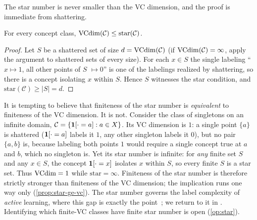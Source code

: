 The star number is never smaller than the VC dimension, and the proof is immediate from shattering.

\begin{prop}
\label{prop:star-ge-vc}
For every concept class, $\mathrm{VCdim}(\mathcal{C}) \leq \mathrm{star}(\mathcal{C})$.
\end{prop}

\begin{proof}
Let $S$ be a shattered set of size $d = \mathrm{VCdim}(\mathcal{C})$ (if $\mathrm{VCdim}(\mathcal{C}) = \infty$, apply the argument to shattered sets of every size). For each $x \in S$ the single labeling ``$x \mapsto 1$, all other points of $S$ $\mapsto 0$'' is one of the labelings realized by shattering, so there is a concept isolating $x$ within $S$. Hence $S$ witnesses the star condition, and $\mathrm{star}(\mathcal{C}) \geq |S| = d$.
\end{proof}

\begin{warning}
\label{rmk:star-not-equiv}
It is tempting to believe that finiteness of the star number is \emph{equivalent} to finiteness of the VC dimension. It is not. Consider the class of singletons on an infinite domain, $\mathcal{C} = \{\mathbf{1}[\cdot = a] : a \in X\}$. Its VC dimension is $1$: a single point $\{a\}$ is shattered ($\mathbf{1}[\cdot=a]$ labels it $1$, any other singleton labels it $0$), but no pair $\{a,b\}$ is, because labeling both points $1$ would require a single concept true at $a$ and $b$, which no singleton is. Yet its star number is infinite: for \emph{any} finite set $S$ and any $x \in S$, the concept $\mathbf{1}[\cdot = x]$ isolates $x$ within $S$, so every finite $S$ is a star set. Thus $\mathrm{VCdim} = 1$ while $\mathrm{star} = \infty$. Finiteness of the star number is therefore strictly stronger than finiteness of the VC dimension; the implication runs one way only (\cref{prop:star-ge-vc}). The star number governs the label complexity of \emph{active} learning, where this gap is exactly the point~\cite{HannekeYang2015}; we return to it in . Identifying which finite-VC classes have finite star number is open (\cref{op:star}).
\end{warning}


